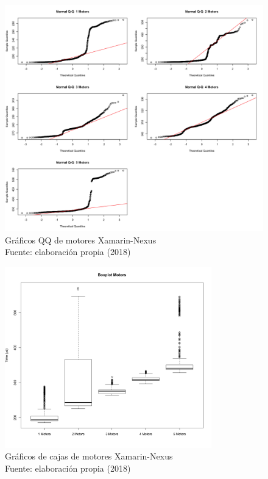 \begin{figure}[H]
  \begin{center} 
   	\includegraphics[width=1.0\textwidth]{evaluation/graphics/Xamarin/Nexus/NormalQQMotorsXamarinNexus.png} 
    \caption[Gráfico QQ de motores Xamarin-Nexus]{Gráficos QQ de motores Xamarin-Nexus\\Fuente: elaboración propia (2018)} 
    \label{fig:xamarin-nexus-QQ-motors}
  \end{center}
\end{figure}

\begin{figure}[H]
  \begin{center} 
   	\includegraphics[width=0.8\textwidth]{evaluation/graphics/Xamarin/Nexus/BoxplotMotorsXamarinNexus.png} 
    \caption[Gráficos de cajas de motores Xamarin-Nexus]{Gráficos de cajas de motores Xamarin-Nexus\\Fuente: elaboración propia (2018)} 
    \label{fig:xamarin-nexus-boxplot-motors}
  \end{center}
\end{figure}


